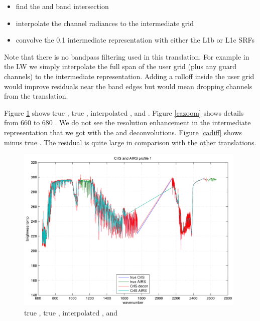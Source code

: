 \documentclass[12pt]{article}
\begin{document}
\begin{itemize}
  \item find the {\airs} and {\cris} band intersection

  \item interpolate the {\cris} channel radiances to the intermediate
    grid 

   \item convolve the 0.1 {\wn} intermediate representation with either
    the {\airs} L1b or L1c SRFs
 
\end{itemize}

Note that there is no bandpass filtering used in this translation.
For example in the LW we simply interpolate the full span of the
{\cris} user grid (plus any guard channels) to the intermediate
representation.  Adding a rolloff inside the user grid would improve
residuals near the band edges but would mean dropping channels from
the translation.

Figure \ref{caspec} shows true {\cris}, true {\airs}, interpolated
{\cris}, and {\cris} {\airs}.  Figure \ref{cazoom} shows details
from 660 to 680 {\wn}.  We do not see the resolution enhancement in
the intermediate representation that we got with the {\iasi} and
{\airs} deconvolutions.  Figure \ref{cadiff} shows {\cris} {\airs}
minus true {\airs}.  The residual is quite large in comparison with
the other translations.

\begin{figure}
  \centering
  \includegraphics[height=8cm]{figures/cris_airs_spec.pdf}
  \caption{true {\cris}, true {\airs}, interpolated {\cris}, and
    {\cris} {\airs} }
  \label{caspec}
\end{figure}
\end{document}
